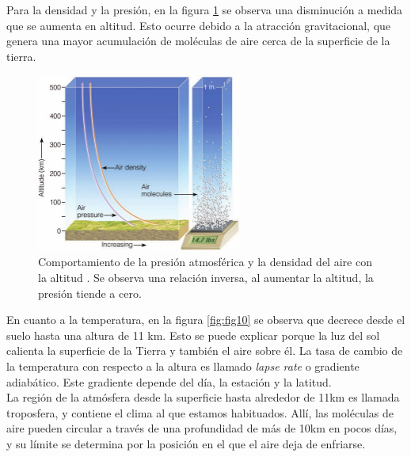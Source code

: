 Para la densidad y la presión, en la figura \ref{fig:fig9} se observa una disminución a medida que se aumenta en altitud. Esto ocurre debido a la atracción gravitacional, que genera una mayor acumulación de moléculas de aire cerca de la superficie de la tierra.\\

\begin{figure}[htb!]
        \begin{center}
		\includegraphics[width=0.6\textwidth]{Figs/PresionDensidad_vs_altitud.png}
        \end{center}
        \caption[Presión atmosférica y densidad del aire en función de la altitud.]{Comportamiento de la presión atmosférica y la densidad del aire con la altitud \parencite{Meteo1}. Se observa una relación inversa, al aumentar la altitud, la presión tiende a cero.}
        \label{fig:fig9}
\end{figure}

En cuanto a la temperatura, en la figura \ref{fig:fig10} se observa que decrece desde el suelo hasta una altura de 11 km. Esto se puede explicar porque la luz del sol calienta la superficie de la Tierra y también el aire sobre él. La tasa de cambio de la temperatura con respecto a la altura es llamado \textit{lapse rate} o gradiente adiabático. Este gradiente depende del día, la estación y la latitud.\\

La región de la atmósfera desde la superficie hasta alrededor de 11km es llamada troposfera, y contiene el clima al que estamos habituados. Allí, las moléculas de aire pueden circular a través de una profundidad de más de 10km en pocos días, y su límite se determina por la posición en el que el aire deja de enfriarse.\\

